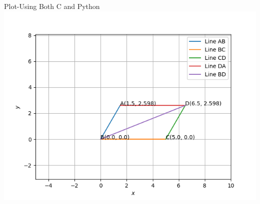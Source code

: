 \documentclass{beamer}
\begin{document}
\begin{frame}{Plot-Using Both C and Python}
    \centering
    \includegraphics[width=\columnwidth, height=0.8\textheight, keepaspectratio]{../figs/fig2.png}     
\end{frame}
\end{document}
